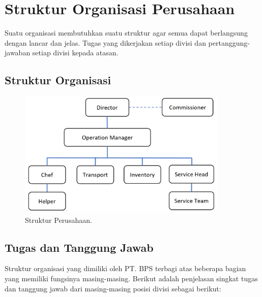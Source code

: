 \pagebreak

\section{Struktur Organisasi Perusahaan}

Suatu organisasi membutuhkan suatu struktur agar semua dapat berlangsung dengan lancar dan jelas. 
Tugas yang dikerjakan setiap divisi dan pertanggung-jawaban setiap divisi kepada atasan.

\subsection{Struktur Organisasi }

\begin{figure}[htbp]
    \begin{center}
    \includegraphics[width=10cm]{img/struktur-org.png}
    \caption{Struktur Perusahaan.}
    \label{gambar:struktur-org}
    \end{center}
\end{figure}

\subsection{Tugas dan Tanggung Jawab}
Struktur organisasi yang dimiliki oleh PT. BPS terbagi atas beberapa bagian yang memiliki 
fungsinya masing-masing. 
Berikut adalah penjelasan singkat tugas dan tanggung jawab dari masing-masing posisi divisi sebagai berikut:

